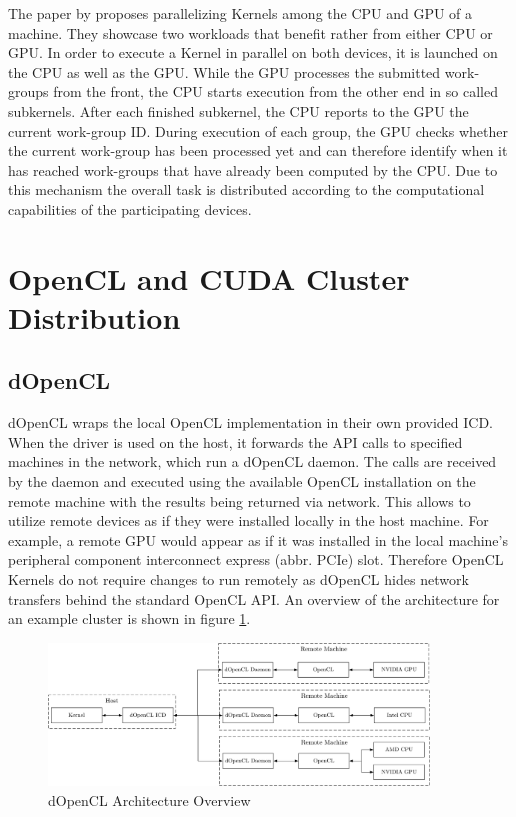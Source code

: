 The paper by \citeauthor{fluidic} proposes parallelizing Kernels among the CPU and GPU of a machine\cite{fluidic}. They showcase two workloads that benefit rather from either CPU or GPU. In order to execute a Kernel in parallel on both devices, it is launched on the CPU as well as the GPU. While the GPU processes the submitted work-groups from the front, the CPU starts execution from the other end in so called subkernels. After each finished subkernel, the CPU reports to the GPU the current work-group ID. During execution of each group, the GPU checks whether the current work-group has been processed yet and can therefore identify when it has reached work-groups that have already been computed by the CPU. Due to this mechanism the overall task is distributed according to the computational capabilities of the participating devices.


\section{OpenCL and CUDA Cluster Distribution}
\label{cluster_distribution}
\subsection*{dOpenCL}

dOpenCL wraps the local OpenCL implementation in their own provided ICD. When the driver is used on the host, it forwards the API calls to specified machines in the network, which run a dOpenCL daemon\cite{dopencl}. The calls are received by the daemon and executed using the available OpenCL installation on the remote machine with the results being returned via network. This allows to utilize remote devices as if they were installed locally in the host machine. For example, a remote GPU would appear as if it was installed in the local machine's peripheral component interconnect express (abbr. PCIe) slot. Therefore OpenCL Kernels do not require changes to run remotely as dOpenCL hides network transfers behind the standard OpenCL API. An overview of the architecture for an example cluster is shown in figure \ref{img:dopencl_arch}.

\begin{figure}[H]

	\includegraphics[width=0.9\textwidth]{drawings/dopencl_arch.pdf}
	\centering
	\caption{dOpenCL Architecture Overview}
	\label{img:dopencl_arch}
\end{figure}

